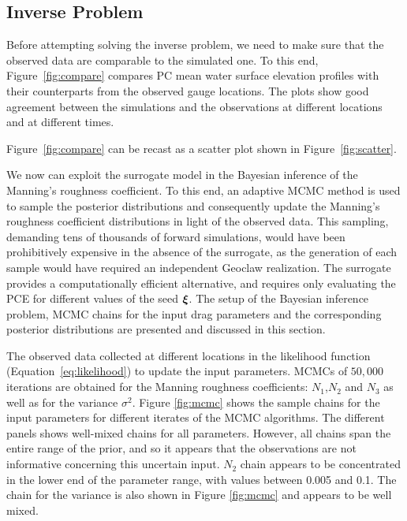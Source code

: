 \subsection{Inverse Problem} 
\label{sec:inverse}

Before attempting solving the inverse problem,
we need to make sure that the observed data are
comparable to the simulated one.
To this end, Figure~\ref{fig:compare}
compares PC mean water surface elevation profiles
with their counterparts from the observed gauge locations.
The plots show good agreement between the simulations and the observations at different
locations and at different times. 
%
   

Figure~\ref{fig:compare} can be recast as a scatter plot shown in 
Figure~\ref{fig:scatter}.
      

We now can exploit the surrogate model in the Bayesian inference of the Manning's 
roughness coefficient.  To this end, an adaptive MCMC method is used to sample 
the posterior distributions \citep{Gareth2009,Haario2001} and consequently 
update the Manning's roughness coefficient distributions in light of the 
observed data. This sampling, demanding tens of thousands of forward simulations, 
would have been prohibitively expensive in the
absence of the surrogate, as the generation of each sample would have required an
independent Geoclaw realization. The surrogate provides a computationally
efficient alternative, and requires only evaluating the PCE for different values 
of the seed $\xxi$. The setup of the Bayesian inference problem,
MCMC chains for the input drag parameters and the corresponding posterior distributions are 
presented and discussed in this section. 




The observed data collected at different locations 
in the likelihood function (Equation~\ref{eq:likelihood}) to update the input parameters.
MCMCs of $50,000$ iterations are obtained for the Manning roughness coefficients: 
$N_1$,$N_2$ and $N_3$ as well as for the variance $\sigma^2$. Figure \ref{fig:mcmc} 
shows the sample chains for
the input parameters for different iterates of the MCMC algorithms. 
The different panels
shows well-mixed chains for all parameters.
However, all chains span the entire range
of the prior, and so it appears that the observations are not informative 
concerning this uncertain input.  $N_{2}$ chain appears to be concentrated in the lower end of the
parameter range, with values between 0.005 and 0.1.
The chain for the variance is also shown in 
Figure \ref{fig:mcmc} and appears to be well mixed.




